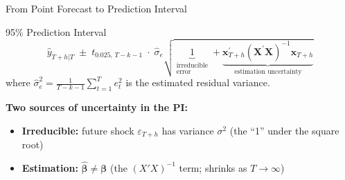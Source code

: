\documentclass[aspectratio=169, 11pt]{beamer}
\begin{document}
\begin{frame}{From Point Forecast to Prediction Interval}
  \begin{definitionbox}{95\% Prediction Interval}
    \[
      \hat{y}_{T+h|T} \;\pm\; t_{0.025,\,T-k-1}\;\cdot\;
      \hat{\sigma}_e \sqrt{\underbrace{1}_{\substack{\text{irreducible}\\\text{error}}}
      + \underbrace{\mathbf{x}_{T+h}^{\prime}
      (\mathbf{X}^{\prime}\mathbf{X})^{-1}\mathbf{x}_{T+h}}_{\text{estimation uncertainty}}}
    \]
    where $\hat{\sigma}_e^2 = \frac{1}{T-k-1}\sum_{t=1}^{T}e_t^2$
    is the estimated residual variance.
  \end{definitionbox}
  \vspace{0.1cm}
  \textbf{Two sources of uncertainty in the PI:}
  \begin{itemize}
    \item \textbf{Irreducible:} future shock $\varepsilon_{T+h}$
          has variance $\sigma^2$ \hfill (the ``1'' under the square root)
    \item \textbf{Estimation:} $\hat{\boldsymbol{\beta}} \neq \boldsymbol{\beta}$
          \hfill (the $(X'X)^{-1}$ term; shrinks as $T \to \infty$)
  \end{itemize}
\end{frame}
\end{document}
